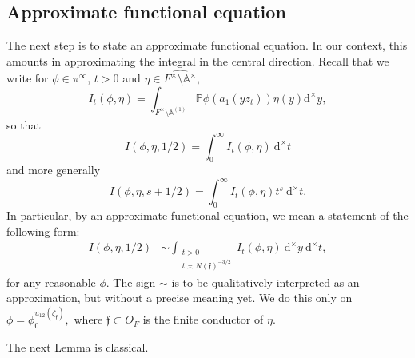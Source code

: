 \documentclass[a4paper,11pt]{amsart}
\theoremstyle{definition}
\newcommand{\A}{\mathbb{A}}
\begin{document}
\subsection{Approximate functional equation}
The next step is to state an approximate functional equation. In our context, this amounts in approximating the integral in the central direction. Recall that we write for $\phi \in \pi^{\infty}$, $t>0$ and $\eta\in \widehat{F^{\times}\setminus\A^{\times}}$, \[I_t(\phi,\eta) = \int_{F^{\times}\setminus\A^{(1)}}\mathbb{P}\phi(a_1(yz_t))\eta(y)  \mathrm{d}^{\times}y, \]
so that 
\[I(\phi,\eta,1/2) = \int_{0}^{\infty}I_t(\phi,\eta)\ \mathrm{d}^{\times}t\]
and more generally
\[I(\phi,\eta,s+1/2) = \int_0^{\infty}I_t(\phi,\eta)t^s\ \mathrm{d}^{\times}t.\]
In particular, by an approximate functional equation, we mean a statement of the following form:
\begin{align*}I(\phi,\eta,1/2) &\sim \int_{\substack{t>0\\ t \asymp N(\mathfrak{f})^{-3/2}}}I_{t}(\phi,\eta) \ \mathrm{d}^{\times}y\ \mathrm{d}^{\times}t, \end{align*}
for any reasonable $\phi$. The sign $\sim$ is to be qualitatively interpreted as an approximation, but without a precise meaning yet.
We do this only on $\phi = \phi_0^{u_{12}(\zeta_{\mathfrak{f}})},$
where $\mathfrak{f}\subset O_F$ is the finite conductor of $\eta$.
 





The next Lemma is classical.
\end{document}
